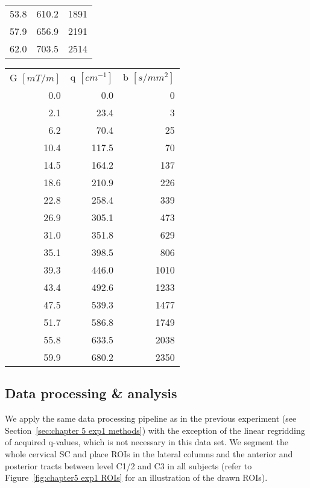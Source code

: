 \begin{table}
{\begin{tabular}{rrr}
                53.8  & 610.2 & 1891 \\
                57.9  & 656.9 & 2191 \\
                62.0  & 703.5 & 2514 \\
                \bottomrule
            \end{tabular}%
            \hspace{0.2cm}%
            \begin{tabular}{rrr}
            \addlinespace
                \multicolumn{3}{l}{\textit{... continued}}\\
            \toprule
                G $[mT/m]$ & q $[cm^{-1}]$ & b $[s/mm^2]$ \\
                \cmidrule(r){1-1}\cmidrule(lr){2-2}\cmidrule(l){3-3}
                0.0   & 0.0   & 0 \\
                2.1   & 23.4  & 3 \\
                6.2   & 70.4  & 25 \\
                10.4  & 117.5 & 70 \\
                14.5  & 164.2 & 137 \\
                18.6  & 210.9 & 226 \\
                22.8  & 258.4 & 339 \\
                26.9  & 305.1 & 473 \\
                31.0  & 351.8 & 629 \\
                35.1  & 398.5 & 806 \\
                39.3  & 446.0 & 1010 \\
                43.4  & 492.6 & 1233 \\
                47.5  & 539.3 & 1477 \\
                51.7  & 586.8 & 1749 \\
                55.8  & 633.5 & 2038 \\
                59.9  & 680.2 & 2350 \\
                \bottomrule
            \end{tabular}%
     }
     \label{tab:chapter6 QSI protocol}
\end{table}



\subsection{Data processing \& analysis}
We apply the same data processing pipeline as in the previous experiment (see Section~\ref{sec:chapter 5 exp1 methods}) with the exception of the linear regridding of acquired q-values, which is not necessary in this data set. We segment the whole cervical {\gls{SC}} and place \glspl{ROI} in the lateral columns and the anterior and posterior tracts between level C1/2 and C3 in all subjects (refer to Figure~\ref{fig:chapter5 exp1 ROIs} for an illustration of the drawn \glspl{ROI}).

